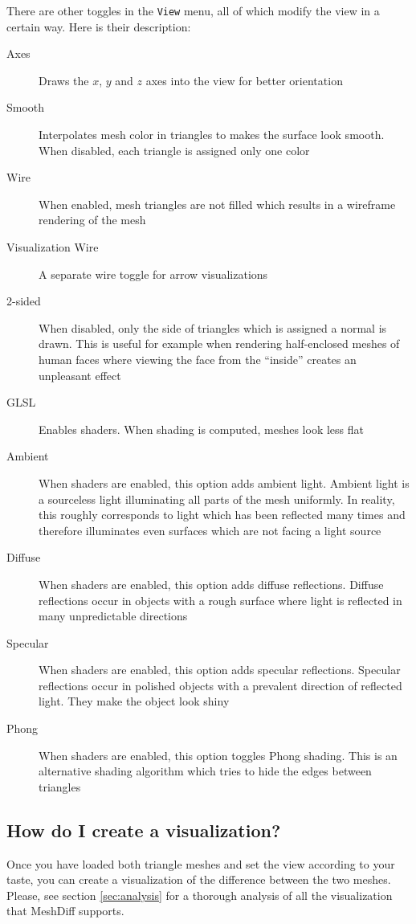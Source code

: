 There are other toggles in the \verb+View+ menu, all of which modify the view in a certain way. Here is their description:

\begin{description}
\item [Axes] Draws the \(x\), \(y\) and \(z\) axes into the view for better orientation
\item [Smooth] Interpolates mesh color in triangles to makes the surface look smooth. When disabled, each triangle is assigned only one color
\item [Wire] When enabled, mesh triangles are not filled which results in a wireframe rendering of the mesh
\item [Visualization Wire] A separate wire toggle for arrow visualizations
\item [2-sided] When disabled, only the side of triangles which is assigned a normal is drawn. This is useful for example when rendering half-enclosed meshes of human faces where viewing the face from the ``inside'' creates an unpleasant effect
\item [GLSL] Enables shaders. When shading is computed, meshes look less flat
\item [Ambient] When shaders are enabled, this option adds ambient light. Ambient light is a sourceless light illuminating all parts of the mesh uniformly. In reality, this roughly corresponds to light which has been reflected many times and therefore illuminates even surfaces which are not facing a light source 
\item [Diffuse] When shaders are enabled, this option adds diffuse reflections. Diffuse reflections occur in objects with a rough surface where light is reflected in many unpredictable directions
\item [Specular] When shaders are enabled, this option adds specular reflections. Specular reflections occur in polished objects with a prevalent direction of reflected light. They make the object look shiny
\item [Phong] When shaders are enabled, this option toggles Phong shading. This is an alternative shading algorithm which tries to hide the edges between triangles
\end{description}

\subsection{How do I create a visualization?}

Once you have loaded both triangle meshes and set the view according to your taste, you can create a visualization of the difference between the two meshes. Please, see section \ref{sec:analysis} for a thorough analysis of all the visualization that MeshDiff supports.

